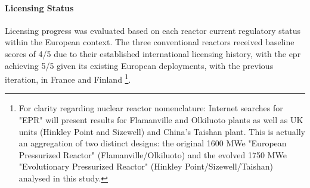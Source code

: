 \paragraph{Licensing Status}
Licensing progress was evaluated based on each reactor current regulatory status within the European context. The three conventional reactors received baseline scores of 4/5 due to their established international licensing history, with the \gls{epr} achieving 5/5 given its existing European deployments, with the previous iteration, in France and Finland \footnote{For clarity regarding nuclear reactor nomenclature: Internet searches for "EPR" will present results for Flamanville and Olkiluoto plants as well as UK units (Hinkley Point and Sizewell) and China's Taishan plant. This is actually an aggregation of two distinct designs: the original 1600 MWe "European Pressurized Reactor" (Flamanville/Olkiluoto) and the evolved 1750 MWe "Evolutionary Pressurized Reactor" (Hinkley Point/Sizewell/Taishan) analysed in this study.}.


